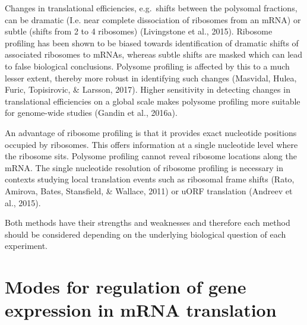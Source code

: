 \documentclass[12pt,openany]{book}
\begin{document}
Changes in translational efficiencies, e.g.~shifts between the polysomal
fractions, can be dramatic (I.e. near complete dissociation of ribosomes
from an mRNA) or subtle (shifts from 2 to 4 ribosomes) (Livingstone et
al., 2015). Ribosome profiling has been shown to be biased towards
identification of dramatic shifts of associated ribosomes to mRNAs,
whereas subtle shifts are masked which can lead to false biological
conclusions. Polysome profiling is affected by this to a much lesser
extent, thereby more robust in identifying such changes (Masvidal,
Hulea, Furic, Topisirovic, \& Larsson, 2017). Higher sensitivity in
detecting changes in translational efficiencies on a global scale makes
polysome profiling more suitable for genome-wide studies (Gandin et al.,
2016a).

An advantage of ribosome profiling is that it provides exact nucleotide
positions occupied by ribosomes. This offers information at a single
nucleotide level where the ribosome sits. Polysome profiling cannot
reveal ribosome locations along the mRNA. The single nucleotide
resolution of ribosome profiling is necessary in contexts studying local
translation events such as ribosomal frame shifts (Rato, Amirova, Bates,
Stansfield, \& Wallace, 2011) or uORF translation (Andreev et al.,
2015).

Both methods have their strengths and weaknesses and therefore each
method should be considered depending on the underlying biological
question of each experiment.

\section{Modes for regulation of gene expression in mRNA translation} \label{modes}
\end{document}
